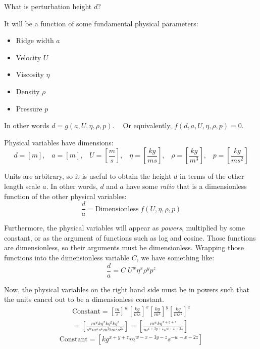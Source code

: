 \documentclass[a4paper]{report}
\begin{document}
What is perturbation height $d$?

It will be a function of some fundamental physical parameters:
\begin{itemize}
    \item Ridge width $a$
    \item Velocity $U$
    \item Viscosity $\eta$
    \item Density $\rho$
    \item Pressure $p$
\end{itemize}

In other words $d = g(a, U, \eta, \rho, p )$. $\;\;$ Or equivalently, $f(d,a,U,\eta, \rho, p)=0$.
\vspace*{1em}

Physical variables have dimensions:
\begin{equation}
d = [m],\;\;\; a = [m],\;\;\; U = \left[\frac{m}{s} \right],\;\;\;
 \eta = \left[\frac{kg}{ms} \right],\;\;\; \rho = \left[\frac{kg}{m^{3}} \right]
 ,\;\;\; p = \left[ \frac{kg}{m s^{2}} \right]
\end{equation}

Units are arbitrary, so it is useful to obtain the height $d$ in terms of the other length scale $a$.  In other words, $d$ and $a$ have some \emph{ratio} that is a dimensionless function of the other physical variables:
\begin{equation}
\frac{d}{a} = \text{Dimensionless} \; f(U, \eta, \rho, p)
\end{equation}

Furthermore, the physical variables will appear as \emph{powers}, multiplied by some constant, or as the argument of functions such as log and cosine.  Those functions are dimensionless, so their arguments must be dimensionless.  Wrapping those functions into the dimensionless variable $C$, we have something like:
\begin{equation}
\frac{d}{a} = C \; U^{w} \eta^{x} \rho^{y} p^{z}
\end{equation}

Now, the physical variables on the right hand side must be in powers such that the units cancel out to be a dimensionless constant.
\begin{gather*}
\text{Constant} = \left[ \frac{m}{s} \right]^{w} \left[ \frac{kg}{ms} \right]^{x}
\left[ \frac{kg}{m^{3}} \right]^{y} \left[ \frac{kg}{m s^{2}} \right]^{z} \\
 = \left[ \frac{m^{w} kg^{x} kg^{y} kg^{z}}{s^{w} m^{x} s^{x} m^{3y} m^{z} s^{2z}} \right] 
 = \left[ \frac{m^{w} kg^{x+y+z}}{m^{x+3y+z} s^{w+x+2z}} \right]
\end{gather*}
\begin{equation}
\text{Constant} = \left[ kg^{x+y+z} m^{w-x-3y-z} s^{-w-x-2z} \right] 
\end{equation}
\end{document}
